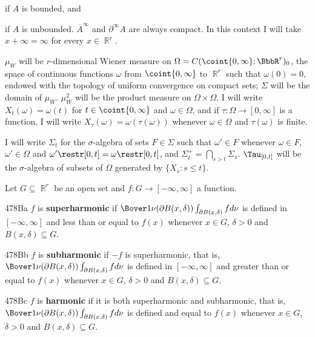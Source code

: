 
\noindent if $A$ is bounded, and


\noindent if $A$ is unbounded.
$\overline{A}^{\infty}$ and
$\partial^{\infty}A$ are always compact.
In this context I will take $x+\infty=\infty$ for every $x\in\BbbR^r$.

$\mu_W$ will be $r$-dimensional Wiener measure on
$\Omega=C(\coint{0,\infty};\BbbR^r)_0$, the space of continuous functions
$\omega$ from
$\coint{0,\infty}$ to $\BbbR^r$ such that $\omega(0)=0$,
endowed with the topology of uniform convergence on compact sets;  $\Sigma$
will be the domain of $\mu_W$.
$\mu_W^2$ will be the product measure on $\Omega\times\Omega$.
I will write $X_t(\omega)=\omega(t)$ for $t\in\coint{0,\infty}$ and
$\omega\in\Omega$, and if $\tau:\Omega\to[0,\infty]$ is a function,
I will write
$X_{\tau}(\omega)=\omega(\tau(\omega))$ whenever $\omega\in\Omega$ and
$\tau(\omega)$ is finite.

 I will write $\Sigma_t$ for
the $\sigma$-algebra of sets $F\in\Sigma$
such that $\omega'\in F$ whenever $\omega\in F$, $\omega'\in\Omega$ and
$\omega'\restr[0,t]=\omega\restr[0,t]$, and
$\Sigma^+_t=\bigcap_{s>t}\Sigma_s$.   $\Tau_{[0,t]}$ will be the
$\sigma$-algebra of subsets of $\Omega$ generated by $\{X_s:s\le t\}$.

 Let $G\subseteq\BbbR^r$
be an open set and $f:G\to[-\infty,\infty]$ a function.

\spheader 478Ba $f$ is {\bf superharmonic} if
$\Bover1{\nu(\partial B(x,\delta))}\int_{\partial B(x,\delta)}fd\nu$ is
defined in $[-\infty,\infty]$ and
less than or equal to $f(x)$ whenever $x\in G$, $\delta>0$ and
$B(x,\delta)\subseteq G$.

\spheader 478Bb $f$ is {\bf subharmonic} if $-f$ is superharmonic, that is,
$\Bover1{\nu(\partial B(x,\delta))}\int_{\partial B(x,\delta)}fd\nu$ is
defined in $[-\infty,\infty]$ and
greater than or equal to $f(x)$ whenever $x\in G$, $\delta>0$ and
$B(x,\delta)\subseteq G$.

\spheader 478Bc $f$ is {\bf harmonic} if it is both superharmonic and
subharmonic, that is,
$\Bover1{\nu(\partial B(x,\delta))}\int_{\partial B(x,\delta)}fd\nu$
is defined and equal to $f(x)$ whenever $x\in G$, $\delta>0$ and
$B(x,\delta)\subseteq G$.

